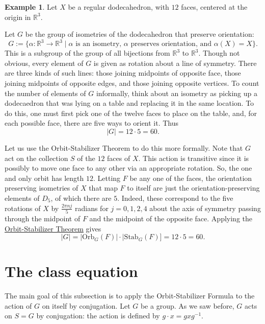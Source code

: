 \documentclass[12pt]{report}
\numberwithin{equation}{section}
\numberwithin{theorem}{chapter}
\theoremstyle{definition}
\newtheorem{example}[theorem]{Example}
\newtheorem*{basic properties}{Basic Properties}
\newtheorem*{Important Remark}{Important Remark}
\begin{document}
\begin{example} 
Let $X$ be a regular dodecahedron, with $12$ faces, centered at the origin in $\mathbb{R}^3$. 


Let $G$ be the group of isometries of the dodecahedron that preserve orientation:
$$G := \{\alpha : \mathbb{R}^3 \to \mathbb{R}^3 \mid \text{$\alpha$ is an isometry, $\alpha$ preserves orientation, and } \alpha(X) = X\}.$$
This is a subgroup of the group of all bijections from $\mathbb{R}^3$ to $\mathbb{R}^3$. Though not obvious, every element of $G$ is given as rotation about a line of symmetry. There are three kinds of such lines: those joining midpoints of opposite face, those joining midpoints of opposite edges, and those joining opposite vertices.  To count the number of elements of $G$ informally, think about an isometry as picking up a dodecaedron that was lying on a table and replacing it in the same location.  To do this, one must first pick one of the twelve faces to place on the table, and, for each possible face, there are five ways to orient it. Thus 
$$|G|=12 \cdot 5 = 60.$$

Let us use the Orbit-Stabilizer Theorem to do this more formally. Note that $G$ act on the collection $S$ of the $12$ faces of $X$. This action is transitive since it is possibly to move one face to any other via an appropriate rotation. So, the one and only orbit has length $12$. Letting $F$ be any one of the faces, the orientation preserving isometries of $X$ that map $F$ to itself are just the orientation-preserving elements of $D_{5}$, of which there are $5$. Indeed, these correspond to the five rotations of $X$ by $\frac{2 \pi n j}{5}$ radians for $j =0,1,2,4$ about the axis of symmetry passing through the midpoint of $F$ and the midpoint of the opposite face.
  Applying the \hyperref[Orbit-Stabilizer Theorem]{Orbit-Stabilizer Theorem} gives
$$|G|=|\mathrm{Orb}_G(F)|\cdot |\mathrm{Stab}_G(F)]=12 \cdot 5=60.$$
\end{example}





\section{The class equation}

The main goal of this subsection is to apply the Orbit-Stabilizer Formula to the action of $G$ on itself by conjugation. 
Let $G$ be a group. As we saw before, $G$ acts on $S = G$ by conjugation: the action is defined by $g \cdot x=gxg^{-1}$.
\end{document}
